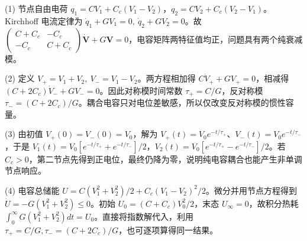(1) 节点自由电荷 \(q_1=CV_1+C_c(V_1-V_2)\)，\(q_2=CV_2+C_c(V_2-V_1)\)。Kirchhoff 电流定律为 \(\dot q_1+GV_1=0,\ \dot q_2+GV_2=0\)。故 \(\begin{pmatrix}C+C_c&-C_c\\-C_c&C+C_c\end{pmatrix}\dot{\boldsymbol V}+G\boldsymbol V=0\)，电容矩阵两特征值均正，问题具有两个纯衰减模。

(2) 定义 \(V_+=V_1+V_2,\ V_-=V_1-V_2\)。两方程相加得 \(C\dot V_++GV_+=0\)，相减得 \((C+2C_c)\dot V_-+GV_-=0\)。因此对称模时间常数 \(\tau_+=C/G\)，反对称模 \(\tau_-=(C+2C_c)/G\)。耦合电容只对电位差敏感，所以仅改变反对称模的惯性容量。

(3) 由初值 \(V_+(0)=V_-(0)=V_0\)，解为 \(V_+(t)=V_0 e^{-t/\tau_+}\)、\(V_-(t)=V_0 e^{-t/\tau_-}\)，于是 \(V_1(t)=V_0[e^{-t/\tau_+}+e^{-t/\tau_-}]/2\)，\(V_2(t)=V_0[e^{-t/\tau_+}-e^{-t/\tau_-}]/2\)。若 \(C_c>0\)，第二节点先得到正电位，最终仍降为零，说明纯电容耦合也能产生非单调节点响应。

(4) 电容总储能 \(U=C(V_1^2+V_2^2)/2+C_c(V_1-V_2)^2/2\)。微分并用节点方程得到 \(\dot U=-G(V_1^2+V_2^2)\le0\)。初始 \(U_0=(C+C_c)V_0^2/2\)，末态 \(U_\infty=0\)，故积分热耗 \(\int_0^\infty G(V_1^2+V_2^2)dt=U_0\)。直接将指数解代入，利用 \(\tau_+=C/G,\tau_-=(C+2C_c)/G\)，也可逐项算得同一结果。
